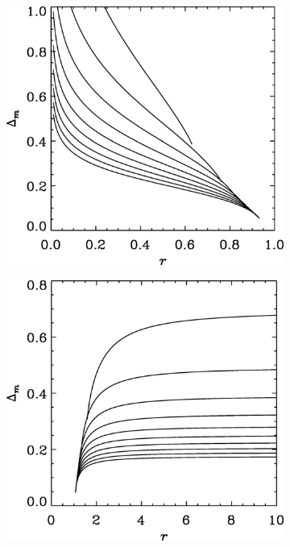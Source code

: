 \begin{figure}
    \centering
    \begin{subfigure}[b]{0.49\textwidth}
        \centering
        \includegraphics[width=\textwidth]{figures/Delta_m_inner.jpeg}
        \label{fig:delta_m_inner}
    \end{subfigure}
    \hfill
    \begin{subfigure}[b]{0.49\textwidth}
        \centering
        \includegraphics[width=\textwidth]{figures/Delta_m_outer.jpeg}

\end{subfigure}
\end{figure}
